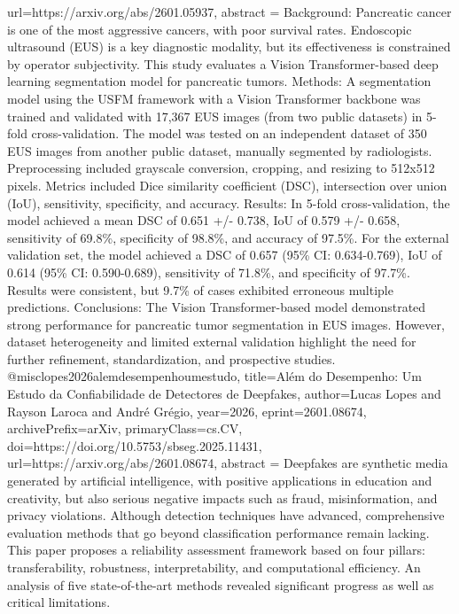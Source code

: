{      url={https://arxiv.org/abs/2601.05937},
      abstract = {Background: Pancreatic cancer is one of the most aggressive cancers, with poor survival rates. Endoscopic ultrasound (EUS) is a key diagnostic modality, but its effectiveness is constrained by operator subjectivity. This study evaluates a Vision Transformer-based deep learning segmentation model for pancreatic tumors. Methods: A segmentation model using the USFM framework with a Vision Transformer backbone was trained and validated with 17,367 EUS images (from two public datasets) in 5-fold cross-validation. The model was tested on an independent dataset of 350 EUS images from another public dataset, manually segmented by radiologists. Preprocessing included grayscale conversion, cropping, and resizing to 512x512 pixels. Metrics included Dice similarity coefficient (DSC), intersection over union (IoU), sensitivity, specificity, and accuracy. Results: In 5-fold cross-validation, the model achieved a mean DSC of 0.651 +/- 0.738, IoU of 0.579 +/- 0.658, sensitivity of 69.8\%, specificity of 98.8\%, and accuracy of 97.5\%. For the external validation set, the model achieved a DSC of 0.657 (95\% CI: 0.634-0.769), IoU of 0.614 (95\% CI: 0.590-0.689), sensitivity of 71.8\%, and specificity of 97.7\%. Results were consistent, but 9.7\% of cases exhibited erroneous multiple predictions. Conclusions: The Vision Transformer-based model demonstrated strong performance for pancreatic tumor segmentation in EUS images. However, dataset heterogeneity and limited external validation highlight the need for further refinement, standardization, and prospective studies.}
}@misc{lopes2026alemdesempenhoumestudo,
      title={Al\'em do Desempenho: Um Estudo da Confiabilidade de Detectores de Deepfakes}, 
      author={Lucas Lopes and Rayson Laroca and André Grégio},
      year={2026},
      eprint={2601.08674},
      archivePrefix={arXiv},
      primaryClass={cs.CV},
      doi={https://doi.org/10.5753/sbseg.2025.11431},
      url={https://arxiv.org/abs/2601.08674},
      abstract = {Deepfakes are synthetic media generated by artificial intelligence, with positive applications in education and creativity, but also serious negative impacts such as fraud, misinformation, and privacy violations. Although detection techniques have advanced, comprehensive evaluation methods that go beyond classification performance remain lacking. This paper proposes a reliability assessment framework based on four pillars: transferability, robustness, interpretability, and computational efficiency. An analysis of five state-of-the-art methods revealed significant progress as well as critical limitations.}
}
